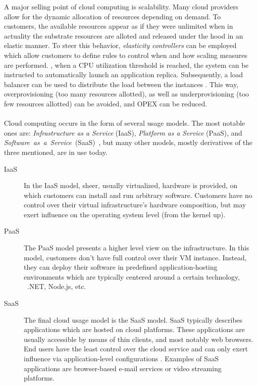 A major selling point of cloud computing is scalability. Many cloud providers allow for the dynamic allocation of resources depending on demand. To customers, the available resources appear as if they were unlimited when in actuality the substrate resources are alloted and released under the hood in an elastic manner. To steer this behavior, \emph{elasticity controllers} can be employed which allow customers to define rules to control when and how scaling measures are performed. \Eg , when a CPU utilization threshold is reached, the system can be instructed to automatically launch an application replica. Subsequently, a load balancer can be used to distribute the load between the instances \cite{vaquero2011dynamically}. This way, overprovisioning (too many resources allotted), as well as underprovisioning (too few resources allotted) can be avoided, and OPEX can be reduced.


\paragraph{}
Cloud computing occurs in the form of several usage models. The most notable ones are: \emph{Infrastructure as a Service} (IaaS),  \emph{Platform as a Service} (PaaS), and \emph{Software~as~a~Service}~(SaaS)~\cite{mell2011nist}, but many other models, mostly derivatives of the three mentioned, are in use today.

\begin{description}
\item[IaaS] In the IaaS model, sheer, usually virtualized, hardware is provided, on which customers can install and run arbitrary software. Customers have no control over their virtual infrastructure's hardware composition, but may exert influence on the operating system level (from the kernel up).
\item[PaaS] The PaaS model presents a higher level view on the infrastructure. In this model, customers don't have full control over their VM instance. Instead, they can deploy their software in predefined application-hosting environments \cite{mell2011nist} which are typically centered around a certain technology, \eg\ .NET, Node.js, etc.
\item[SaaS] The final cloud usage model is the SaaS model. SaaS typically describes applications which are hosted on cloud platforms. These applications are usually accessible by means of thin clients, and most notably web browsers. End users have the least control over the cloud service and can only exert influence via application-level configurations \cite{mell2011nist}. Examples of SaaS applications are browser-based e-mail services or video streaming platforms.
\end{description}

